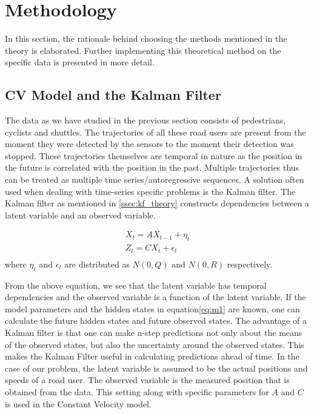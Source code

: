 \documentclass{article}
\begin{document}
\section{Methodology}
In this section, the rationale behind choosing the methods mentioned in the theory is elaborated. Further implementing this theoretical method on the specific data is presented in more detail. 

\subsection{CV Model and the Kalman Filter}\label{ssec:CV_model}

The data as we have studied in the previous section consists of pedestrians, cyclists and shuttles. The trajectories of all these road users are present from the moment they were detected by the sensors to the moment their detection was stopped. These trajectories themselves are temporal in nature as the position in the future is correlated with the position in the past. Multiple trajectories thus can be treated as multiple time series/autoregressive sequences. A solution often used when dealing with time-series specific problems is the Kalman filter. The Kalman filter as mentioned in \ref{ssec:kf_theory} constructs dependencies between a latent variable and an observed variable. 

\begin{equation}\label{eq:m1}
\begin{split}
    X_{t}=AX_{t-1} + \eta_t\\
    Z_{t}=CX_{t}+\epsilon_t\\
\end{split}
\end{equation}
where $\eta_t$ and $\epsilon_t$ are distributed as $N(0,Q)$ and $N(0,R)$ respectively. 

From the above equation, we see that the latent variable has temporal dependencies and the observed variable is a function of the latent variable. If the model parameters and the hidden states in equation\ref{eq:m1} are known, one can calculate the future hidden states and future observed states. The advantage of a Kalman filter is that one can make n-step predictions not only about the means of the observed states, but also the uncertainty around the observed states. This makes the Kalman Filter useful in calculating predictions ahead of time. In the case of our problem, the latent variable is assumed to be the actual positions and speeds of a road user. The observed variable is the measured position that is obtained from the data. This setting along with specific parameters for $A$ and $C$ is used in the Constant Velocity model. 
\end{document}
